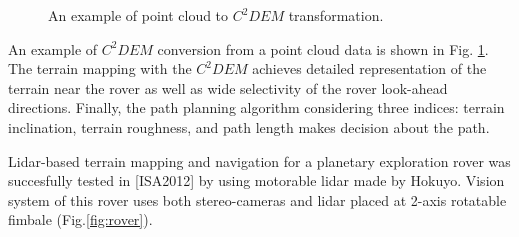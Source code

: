\begin{minipage}[h]{0.45\linewidth}
\begin{figure}[H]
\caption{An example of point cloud to $C^2DEM$ transformation.}
\label{fig:DEC}
\end{figure}
\end{minipage}
\hfill
\begin{minipage}[h]{0.48\linewidth}
An example of $C^2DEM$ conversion from a point cloud data is shown in Fig. \ref{fig:DEC}.
The terrain mapping with the $C^2DEM$ achieves detailed representation of the terrain near the rover as well as wide selectivity of the rover look-ahead directions.
Finally, the path planning algorithm considering three indices: terrain inclination, terrain roughness, and path length makes decision about  the path.

\end{minipage}
\vspace{1cm}

Lidar-based terrain mapping and navigation for a planetary exploration rover was succesfully tested in [ISA2012] by using motorable lidar made by Hokuyo. Vision system of this rover uses both stereo-cameras and lidar placed at 2-axis rotatable fimbale (Fig.\ref{fig:rover}).



\begin{figure}[H]
\begin{floatrow}


\end{floatrow}
\end{figure}




